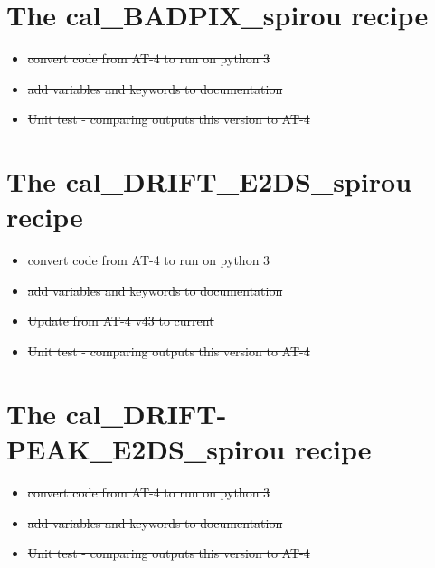 \section{The cal\_BADPIX\_spirou recipe}
\label{ch:todo:cal_BADPIX_spirou}

\begin{itemize}
	\item \sout{convert code from AT-4 to run on python 3}
	\item \sout{add variables and keywords to documentation}
	\item \sout{Unit test - comparing outputs this version to AT-4}
\end{itemize}


\section{The cal\_DRIFT\_E2DS\_spirou recipe}
\label{ch:todo:cal_DRIFT_E2DS_spirou}

\begin{itemize}
	\item \sout{convert code from AT-4 to run on python 3}
	\item \sout{add variables and keywords to documentation}
	\item \sout{Update from AT-4 v43 to current}
	\item \sout{Unit test - comparing outputs this version to AT-4}
\end{itemize}


\section{The cal\_DRIFT-PEAK\_E2DS\_spirou recipe}
\label{ch:todo:cal_DRIFTPEAK_E2DS_spirou}

\begin{itemize}
	\item \sout{convert code from AT-4 to run on python 3}
	\item \sout{add variables and keywords to documentation}
	\item \sout{Unit test - comparing outputs this version to AT-4}
\end{itemize}


